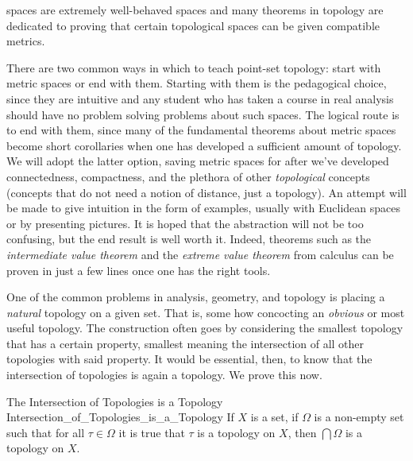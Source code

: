     spaces are extremely well-behaved spaces and many theorems in topology are
    dedicated to proving that certain topological spaces can be given
    compatible metrics.
    \par\hfill\par
    There are two common ways in which to teach point-set topology: start with
    metric spaces or end with them. Starting with them is the pedagogical
    choice, since they are intuitive and any student who has taken a course in
    real analysis should have no problem solving problems about such spaces. The
    logical route is to end with them, since many of the fundamental theorems
    about metric spaces become short corollaries when one has developed a
    sufficient amount of topology. We will adopt the latter option, saving
    metric spaces for after we've developed connectedness, compactness, and the
    plethora of other \textit{topological} concepts (concepts that do not need
    a notion of distance, just a topology). An attempt will be made to give
    intuition in the form of examples, usually with Euclidean spaces or by
    presenting pictures. It is hoped that the abstraction will not be too
    confusing, but the end result is well worth it. Indeed, theorems such as the
    \textit{intermediate value theorem} and the \textit{extreme value theorem}
    from calculus can be proven in just a few lines once one has the right
    tools.
    \par\hfill\par
    One of the common problems in analysis, geometry, and topology is placing a
    \textit{natural} topology on a given set. That is, some how concocting an
    \textit{obvious} or most useful topology. The construction often goes by
    considering the smallest topology that has a certain property, smallest
    meaning the intersection of all other topologies with said property. It
    would be essential, then, to know that the intersection of topologies is
    again a topology. We prove this now.
    \begin{ltheorem}{The Intersection of Topologies is a Topology}
                   {Intersection_of_Topologies_is_a_Topology}
        If $X$ is a set, if $\Omega$ is a non-empty set such that for all
        $\tau\in\Omega$ it is true that $\tau$ is a topology on $X$, then
        $\bigcap\Omega$ is a topology on $X$.
    \end{ltheorem}
